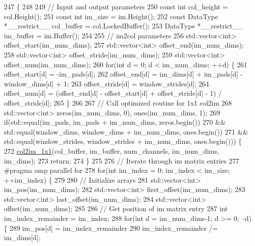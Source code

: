 \begin{DoxyCode}
247                                                                                  \{
248 
249   \textcolor{comment}{// Input and output parameters}
250   \textcolor{keyword}{const} \textcolor{keywordtype}{int} col\_height = col.Height();
251   \textcolor{keyword}{const} \textcolor{keywordtype}{int} im\_size = im.Height();
252   \textcolor{keyword}{const} DataType *\_\_restrict\_\_ col\_buffer = col.LockedBuffer();
253   DataType *\_\_restrict\_\_ im\_buffer = im.Buffer();
254 
255   \textcolor{comment}{// im2col parameters}
256   std::vector<int> offset\_start(im\_num\_dims);
257   std::vector<int> offset\_end(im\_num\_dims);
258   std::vector<int> offset\_stride(im\_num\_dims);
259   std::vector<int> offset\_num(im\_num\_dims);
260   \textcolor{keywordflow}{for}(\textcolor{keywordtype}{int} d = 0; d < im\_num\_dims; ++d) \{
261     offset\_start[d] = -im\_pads[d];
262     offset\_end[d] = im\_dims[d] + im\_pads[d] - window\_dims[d] + 1;
263     offset\_stride[d] = window\_strides[d];
264     offset\_num[d] = (offset\_end[d] - offset\_start[d] + offset\_stride[d] - 1) / offset\_stride[d];
265   \}
266 
267   \textcolor{comment}{// Call optimized routine for 1x1 col2im}
268   std::vector<int> zeros(im\_num\_dims, 0), ones(im\_num\_dims, 1);
269   \textcolor{keywordflow}{if}(std::equal(im\_pads, im\_pads + im\_num\_dims, zeros.begin())
270      && std::equal(window\_dims, window\_dims + im\_num\_dims, ones.begin())
271      && std::equal(window\_strides, window\_strides + im\_num\_dims, ones.begin())) \{
272     \hyperlink{namespacelbann_ab4fccda3dc4c2c293d643815dfefe22a}{col2im\_1x1}(col\_buffer, im\_buffer, num\_channels, im\_num\_dims, im\_dims);
273     \textcolor{keywordflow}{return};
274   \}
275 
276   \textcolor{comment}{// Iterate through im matrix entries}
277 \textcolor{preprocessor}{  #pragma omp parallel for}
278   \textcolor{keywordflow}{for}(\textcolor{keywordtype}{int} im\_index = 0; im\_index < im\_size; ++im\_index) \{
279 
280     \textcolor{comment}{// Initialize arrays}
281     std::vector<int> im\_pos(im\_num\_dims);
282     std::vector<int> first\_offset(im\_num\_dims);
283     std::vector<int> last\_offset(im\_num\_dims);
284     std::vector<int> offset(im\_num\_dims);
285 
286     \textcolor{comment}{// Get position of im matrix entry}
287     \textcolor{keywordtype}{int} im\_index\_remainder = im\_index;
288     \textcolor{keywordflow}{for}(\textcolor{keywordtype}{int} d = im\_num\_dims-1; d >= 0; --d) \{
289       im\_pos[d] = im\_index\_remainder %
290       im\_index\_remainder /= im\_dims[d];

\end{DoxyCode}
